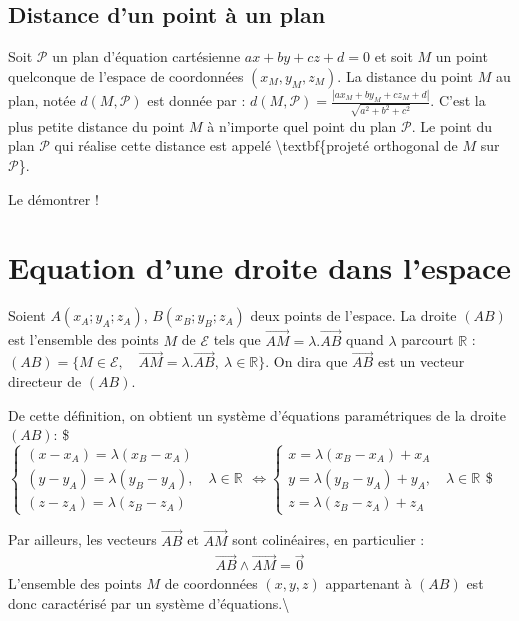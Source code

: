 \documentclass[letterpaper,10pt,english]{jupyterBook}
\begin{document}
\section{Distance d’un point à un plan}
\label{\detokenize{Part1/Cours:distance-d-un-point-a-un-plan}}
\sphinxAtStartPar
Soit \(\mathcal{P}\) un plan d’équation cartésienne \(ax + by + cz +d =0\) et soit \(M\) un point quelconque de l’espace de coordonnées \((x_M,y_M,z_M)\). La distance du point \(M\) au plan, notée \(d(M,\mathcal{P})\) est donnée par :
\(d(M,\mathcal{P}) = \frac{|ax_M+ by_M + cz_M + d|}{\sqrt{a^2+b^2+c^2}}.\)
C’est la plus petite distance du point \(M\) à n’importe quel point du plan \(\mathcal{P}\). Le point du plan \(\mathcal{P}\) qui réalise cette distance est appelé \textbackslash{}textbf\{projeté orthogonal de \(M\) sur \(\mathcal{P}\)\}.

\sphinxAtStartPar
{} Le démontrer !


\chapter{Equation d’une droite dans l’espace}
\label{\detokenize{Part1/Cours:equation-d-une-droite-dans-l-espace}}
\sphinxAtStartPar
Soient \(A(x_A;y_A;z_A)\), \(B(x_B;y_B;z_A)\) deux points de l’espace. La droite \((AB)\) est l’ensemble des points \(M\) de \(\mathcal{E}\)  tels que \(\vec{AM} = \lambda .\vec{AB} \) quand \(\lambda\) parcourt \(\mathbb{R}\) :
\((AB) = \{M \in \mathcal{E},\quad \vec{AM} = \lambda. \vec{AB},\ \lambda \in \mathbb{R}\}.\)
On dira que \(\vec{AB}\) est un vecteur directeur de \((AB)\).

\sphinxAtStartPar
De cette définition, on obtient un système d’équations paramétriques de la droite \((AB)\):
\$\(
\left\lbrace\begin{array}{lll}
(x-x_A) = \lambda (x_B-x_A)\\
(y-y_A) = \lambda (y_B-y_A),\quad \lambda \in \mathbb{R}\\
(z-z_A) = \lambda (z_B-z_A)
\end{array}\right. \Leftrightarrow \left\lbrace\begin{array}{lll}
x = \lambda (x_B-x_A) + x_A\\
y = \lambda (y_B-y_A)+ y_A ,\quad \lambda \in \mathbb{R}\\
z = \lambda (z_B-z_A)+ z_A
\end{array}\right. 
\)\$

\sphinxAtStartPar
Par ailleurs, les vecteurs \(\vec{AB}\) et \(\vec{AM}\) sont colinéaires, en particulier :
\begin{equation*}
\begin{split}
\vec{AB} \wedge \vec{AM} = \vec{0}
\end{split}
\end{equation*}
\sphinxAtStartPar
L’ensemble des points \(M\) de coordonnées \((x,y,z)\) appartenant à \((AB)\) est donc caractérisé par un système d’équations.\textbackslash{}
\end{document}
